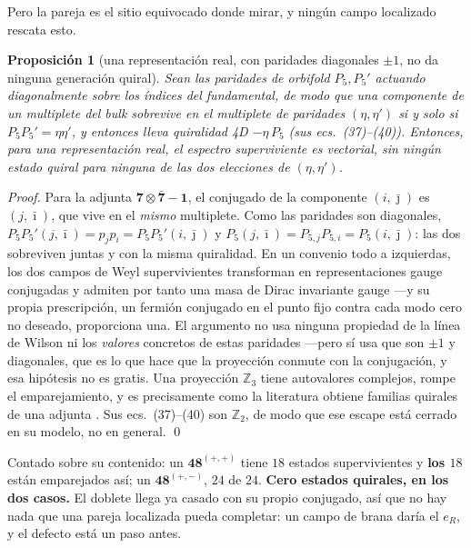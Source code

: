 \documentclass[11pt,a4paper]{article}
\newtheorem{proposition}{Proposición}
\newcommand{\ZZ}{\mathbb{Z}}
\newcommand{\rep}[1]{\mathbf{#1}}
\begin{document}
Pero la pareja es el sitio equivocado donde mirar, y ningún campo localizado rescata esto.

\begin{proposition}[una representación real, con paridades diagonales $\pm1$, no da ninguna
generación quiral]\label{prop:real}
Sean las paridades de orbifold $P_5,P_5'$ actuando diagonalmente sobre los índices del fundamental,
de modo que una componente de un multiplete del bulk sobrevive en el multiplete de paridades
$(\eta,\eta')$ si y solo si $P_5P_5'=\eta\eta'$, y entonces lleva quiralidad 4D $-\eta\,P_5$ (sus
ecs.~(37)--(40)). Entonces, para una representación \emph{real}, el espectro superviviente es
vectorial, sin ningún estado quiral para ninguna de las dos elecciones de $(\eta,\eta')$.
\end{proposition}

\begin{proof}
Para la adjunta $\rep7\otimes\rep{\bar7}-\rep1$, el conjugado de la componente $(i,\bar\jmath)$ es
$(j,\bar\imath)$, que vive en el \emph{mismo} multiplete. Como las paridades son diagonales,
$P_5P_5'(j,\bar\imath)=p_jp_i=P_5P_5'(i,\bar\jmath)$ y
$P_5(j,\bar\imath)=P_{5,j}P_{5,i}=P_5(i,\bar\jmath)$: las dos sobreviven juntas y con la misma
quiralidad. En un convenio todo a izquierdas, los dos campos de Weyl supervivientes transforman en
representaciones gauge conjugadas y admiten por tanto una masa de Dirac invariante gauge
---y su propia prescripción, un fermión conjugado en el punto fijo contra cada modo cero no deseado,
proporciona una. El argumento no usa ninguna propiedad de la línea de Wilson ni los \emph{valores}
concretos de estas paridades ---pero sí usa que son $\pm1$ y diagonales, que es lo que hace que la
proyección conmute con la conjugación, y esa hipótesis no es gratis. Una proyección $\ZZ_3$ tiene
autovalores complejos, rompe el emparejamiento, y es precisamente como la literatura obtiene familias
quirales de una adjunta \cite{GMN}. Sus ecs.~(37)--(40) son $\ZZ_2$, de modo que ese escape está
cerrado en su modelo, no en general. \qed
\end{proof}

\noindent Contado sobre su contenido: un $\rep{48}^{(+,+)}$ tiene $18$ estados supervivientes y
\textbf{los $18$} están emparejados así; un $\rep{48}^{(+,-)}$, $24$ de $24$. \textbf{Cero estados
quirales, en los dos casos.} El doblete llega ya casado con su propio conjugado, así que no hay nada
que una pareja localizada pueda completar: un campo de brana daría el $e_R$, y el defecto está un
paso antes.
\end{document}
